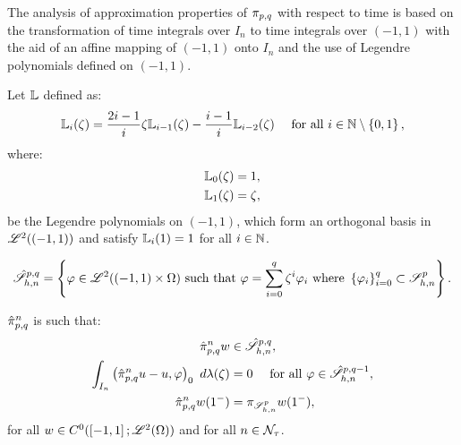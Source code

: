 The analysis of approximation properties of $\pi_{p, q}$ with respect to time is based on the transformation of time integrals over $I_n$ to time integrals over $\left( -1, 1 \right)$ with the aid of an affine mapping of $\left( -1, 1 \right)$ onto $I_n$ and the use of Legendre polynomials defined on $\left( -1, 1 \right)$.

\begin{definition}
    Let $\mathbb{L}$ defined as:
    \begin{gather}
        \mathbb{L}_{i}(\zeta) = \frac{2i - 1}{i} \zeta \mathbb{L}_{i - 1}(\zeta) - \frac{i - 1}{i} \mathbb{L}_{i - 2}(\zeta) \quad \text{ for all } i \in \mathbb{N} \setminus \left\{ 0, 1 \right\},
    \end{gather}
    where:
    \begin{align}
        \mathbb{L}_{0}(\zeta) &= 1, \\
        \mathbb{L}_{1}(\zeta) &= \zeta,
    \end{align}
    be the Legendre polynomials on $\left( -1, 1 \right)$, which form an orthogonal basis in $\mathscr{L}^{2}(\left( -1, 1 \right))$ and satisfy $\mathbb{L}_i(1) = 1$ for all $i \in \mathbb{N}$.
\end{definition}

\begin{definition}[$\SpaceSolutionReference$]
    \begin{gather}
        \hat{\mathscr{S}}^{p, q}_{h, n} = \left\{ \varphi \in \mathscr{L}^{2}(\left( -1, 1 \right) \times \Omega) \text{ such that } \varphi = \sum_{i = 0}^q \zeta^i \varphi_i \text{ where } \left\{ \varphi_i \right\}_{i = 0}^q \subset \mathscr{S}_{h, n}^p \right\}.
    \end{gather}
\end{definition}

\begin{definition}[$\InterpolantPQR$] \label{definition:interpolant_ref_qp}
    $\InterpolantPQR$ is such that:
    \begin{align}
        \hat{\pi}_{p, q}^n w &\in \hat{\mathscr{S}}^{p, q}_{h, n}, \\
        \int_{I_n} \left( \hat{\pi}_{p, q}^n u - u, \varphi \right)_0 ~ d \lambda(\zeta) &= 0 \quad \text{ for all } \varphi \in \hat{\mathscr{S}}^{p, q - 1}_{h, n}, \\
        \hat{\pi}_{p, q}^n w(1^-) &= \pi_{\mathscr{S}^p_{h, n}} w(1^-),
    \end{align}
    for all $w \in C^0(\left[ -1, 1 \right]; \mathscr{L}^{2}(\Omega))$ and for all $n \in \mathcal{N}_{\tau}$.
\end{definition}

